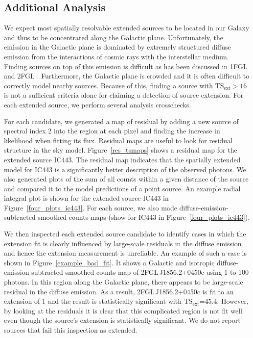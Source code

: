\documentclass[12pt,preprint]{aastex}
\newcommand{\gev}{\text{GeV}\xspace}
\newcommand{\tsext}{{\ensuremath{\text{TS}_{\text{ext}}}}\xspace}
\newcommand{\ts}{\text{TS}\xspace}
\begin{document}
\subsection{Additional Analysis}

We expect most spatially resolvable extended sources to be located
in our Galaxy and thus to be concentrated along the Galactic plane.
Unfortunately, the \gev emission in the Galactic plane is dominated by
extremely structured diffuse emission from the interactions of cosmic rays
with the interstellar medium.  Finding sources on top of this emission
is difficult \citep{first_diffuse_paper} as has been discussed in 1FGL
and 2FGL \citep{first_cat,second_cat}.  Furthermore, the Galactic plane
is crowded and it is often difficult to correctly model nearby sources.
Because of this, finding a source with $\tsext>16$ is not a sufficient
criteria alone for claiming a detection of source extension.  For each
extended source, we perform several analysis crosschecks.

For each candidate, we generated a map of residual \ts by adding a new
source of spectral index 2 into the region at each pixel and finding the
increase in likelihood when fitting its flux. Residual \ts maps are useful
to look for residual structure in the sky model.  Figure~\ref{res_tsmaps}
shows a residual \ts map for the extended source IC443.  The residual
\ts map indicates that the spatially extended model for IC443 is a
significantly better description of the observed photons.  We also
generated plots of the sum of all counts within a given distance of
the source and compared it to the model predictions of a point source.
An example radial integral plot is shown for the extended source
IC443 in Figure~\ref{four_plots_ic443}.  For each source, we also made
diffuse-emission-subtracted smoothed counts maps (show for IC443 in
Figure~\ref{four_plots_ic443}).

We then inspected each extended source candidate to identify cases in
which the extension fit is clearly influenced by large-scale residuals in
the diffuse emission and hence the extension measurement is unreliable.
An example of such a case is shown in Figure~\ref{example_bad_fit}. It
shows a Galactic and isotropic diffuse-emission-subtracted smoothed
counts map of 2FGL\,J1856.2+0450c using 1 \gev to 100 \gev photons.
In this region along the Galactic plane, there appears to be large-scale
residual in the diffuse emission. As a result, 2FGL\,J1856.2+0450c is fit
to an extension of 1 and the result is statistically significant
with \tsext=45.4. However, by looking at the residuals it is clear
that this complicated region is not fit well even though the source's
extension is statistically significant. We do not report sources that
fail this inspection as extended.
\end{document}
